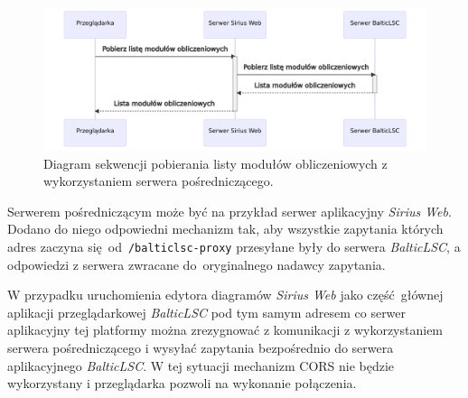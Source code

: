 \begin{figure}[!hb]
  \centering

  \includegraphics[width=0.95\linewidth]{./images/balticlsc-proxy-sequence-diagram.pdf}
  \caption{Diagram sekwencji pobierania listy modułów obliczeniowych z
    wykorzystaniem serwera pośredniczącego.}\label{rys:balticlsc-proxy-sequence-diagram}
\end{figure}

%
%
%

Serwerem pośredniczącym może być na przykład serwer aplikacyjny \emph{Sirius
	Web}. Dodano do niego odpowiedni mechanizm tak, aby wszystkie zapytania
których adres
zaczyna się~od~\texttt{/balticlsc-proxy} przesyłane były do serwera
\emph{BalticLSC}, a odpowiedzi z serwera zwracane do~oryginalnego nadawcy
zapytania.

W przypadku uruchomienia edytora diagramów \emph{Sirius Web} jako część głównej
aplikacji przeglądarkowej \emph{BalticLSC} pod tym samym adresem co serwer
aplikacyjny tej platformy można zrezygnować z komunikacji z wykorzystaniem
serwera pośredniczącego i wysyłać zapytania bezpośrednio do serwera
aplikacyjnego \emph{BalticLSC}. W tej sytuacji mechanizm \gls{CORS} nie będzie
wykorzystany i przeglądarka pozwoli na wykonanie połączenia.

